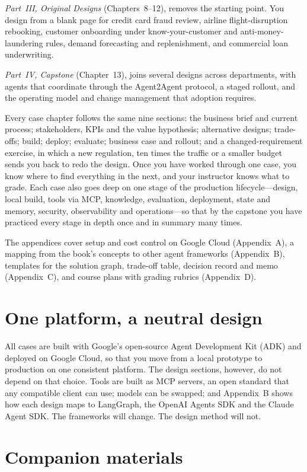 \emph{Part~III, Original Designs} (Chapters~8--12), removes the starting point. You design from a blank page for credit card fraud review, airline flight-disruption rebooking, customer onboarding under know-your-customer and anti-money-laundering rules, demand forecasting and replenishment, and commercial loan underwriting.

\emph{Part~IV, Capstone} (Chapter~13), joins several designs across departments, with agents that coordinate through the Agent2Agent protocol, a staged rollout, and the operating model and change management that adoption requires.

Every case chapter follows the same nine sections: the business brief and current process; stakeholders, KPIs and the value hypothesis; alternative designs; trade-offs; build; deploy; evaluate; business case and rollout; and a changed-requirement exercise, in which a new regulation, ten times the traffic or a smaller budget sends you back to redo the design. Once you have worked through one case, you know where to find everything in the next, and your instructor knows what to grade. Each case also goes deep on one stage of the production lifecycle---design, local build, tools via MCP, knowledge, evaluation, deployment, state and memory, security, observability and operations---so that by the capstone you have practiced every stage in depth once and in summary many times.

The appendices cover setup and cost control on Google Cloud (Appendix~A), a mapping from the book's concepts to other agent frameworks (Appendix~B), templates for the solution graph, trade-off table, decision record and memo (Appendix~C), and course plans with grading rubrics (Appendix~D).

\section*{One platform, a neutral design}

All cases are built with Google's open-source Agent Development Kit (ADK) and deployed on Google Cloud, so that you move from a local prototype to production on one consistent platform. The design sections, however, do not depend on that choice. Tools are built as MCP servers, an open standard that any compatible client can use; models can be swapped; and Appendix~B shows how each design maps to LangGraph, the OpenAI Agents SDK and the Claude Agent SDK. The frameworks will change. The design method will not.

\section*{Companion materials}

